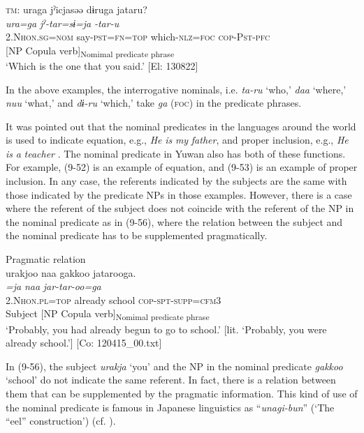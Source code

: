 \ex \label{ex:9.55d} \textsc{tm}:
    \glll uraga  jˀicjasəə  dɨruga    jataru?\\
      \textit{ura=ga}  \textit{jˀ-tar=sɨ=ja}  \textit{} \textit{-tar-u}\\
      2.N\textsc{hon}.\textsc{sg}=\textsc{nom}  say-\textsc{pst}=\textsc{fn}=\textsc{top}  which-\textsc{nlz}=\textsc{foc}  \textsc{cop}-P\textsc{st}-\textsc{pfc}\\
       {} {}  [NP       {Copula verb]\textsubscript{Nomimal predicate phrase}}\\
      \glt ‘Which is the one that you said.’    [El: 130822]
    \z
\z

In the above examples, the interrogative nominals, i.e. \textit{ta-ru} ‘who,’ \textit{daa} ‘where,’ \textit{nuu} ‘what,’ and \textit{dɨ-ru} ‘which,’ take \textit{ga} (\textsc{foc}) in the predicate phrases.

It was pointed out that the nominal predicates in the languages around the world is used to indicate equation, e.g., \textit{He} \textit{is} \textit{my} \textit{father}, and proper inclusion, e.g., \textit{He} \textit{is} \textit{a} \textit{teacher} \citep[114]{Payne1997}. The nominal predicate in Yuwan also has both of these functions. For example, (9-52) is an example of equation, and (9-53) is an example of proper inclusion. In any case, the referents indicated by the subjects are the same with those indicated by the predicate NPs in those examples. However, there is a case where the referent of the subject does not coincide with the referent of the NP in the nominal predicate as in (9-56), where the relation between the subject and the nominal predicate has to be supplemented pragmatically.

\ea   Pragmatic relation \label{ex:9.56}\\
 \gllll  urakjoo  naa  gakkoo  jatarooga.\\
    \textit{=ja}  \textit{naa}  \textit{}  \textit{jar-tar-oo=ga}\\
    2.N\textsc{hon}.\textsc{pl}=\textsc{top}  already  school  \textsc{cop}-\textsc{spt}-\textsc{supp}=\textsc{cfm}3\\
    Subject    [NP  Copula verb]\textsubscript{Nomimal predicate phrase}\\
    \glt     ‘Probably, you had already begun to go to school.’ [lit. ‘Probably, you were already school.’] [Co: 120415\_00.txt]
\z

In (9-56), the subject \textit{urakja} ‘you’ and the NP in the nominal predicate \textit{gakkoo} ‘school’ do not indicate the same referent. In fact, there is a relation between them that can be supplemented by the pragmatic information. This kind of use of the nominal predicate is famous in Japanese linguistics as “\textit{unagi-bun}” (‘The “eel” construction’) (cf. \citealt{Okutsu1978}).


